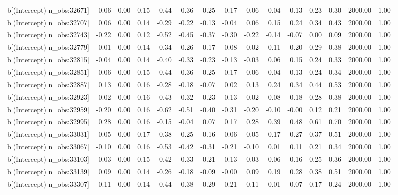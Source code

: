 \begin{table}[ht]
\begin{tabular}{rrrrrrrrrrrrrrr}
  b[(Intercept) n\_obs:32671] & -0.06 & 0.00 & 0.15 & -0.44 & -0.36 & -0.25 & -0.17 & -0.06 & 0.04 & 0.13 & 0.23 & 0.30 & 2000.00 & 1.00 \\ 
  b[(Intercept) n\_obs:32707] & 0.06 & 0.00 & 0.14 & -0.29 & -0.22 & -0.13 & -0.04 & 0.06 & 0.15 & 0.24 & 0.34 & 0.43 & 2000.00 & 1.00 \\ 
  b[(Intercept) n\_obs:32743] & -0.22 & 0.00 & 0.12 & -0.52 & -0.45 & -0.37 & -0.30 & -0.22 & -0.14 & -0.07 & 0.00 & 0.09 & 2000.00 & 1.00 \\ 
  b[(Intercept) n\_obs:32779] & 0.01 & 0.00 & 0.14 & -0.34 & -0.26 & -0.17 & -0.08 & 0.02 & 0.11 & 0.20 & 0.29 & 0.38 & 2000.00 & 1.00 \\ 
  b[(Intercept) n\_obs:32815] & -0.04 & 0.00 & 0.14 & -0.40 & -0.33 & -0.23 & -0.13 & -0.03 & 0.06 & 0.15 & 0.24 & 0.33 & 2000.00 & 1.00 \\ 
  b[(Intercept) n\_obs:32851] & -0.06 & 0.00 & 0.15 & -0.44 & -0.36 & -0.25 & -0.17 & -0.06 & 0.04 & 0.13 & 0.24 & 0.34 & 2000.00 & 1.00 \\ 
  b[(Intercept) n\_obs:32887] & 0.13 & 0.00 & 0.16 & -0.28 & -0.18 & -0.07 & 0.02 & 0.13 & 0.24 & 0.34 & 0.44 & 0.53 & 2000.00 & 1.00 \\ 
  b[(Intercept) n\_obs:32923] & -0.02 & 0.00 & 0.16 & -0.43 & -0.32 & -0.23 & -0.13 & -0.02 & 0.08 & 0.18 & 0.28 & 0.38 & 2000.00 & 1.00 \\ 
  b[(Intercept) n\_obs:32959] & -0.20 & 0.00 & 0.16 & -0.62 & -0.51 & -0.40 & -0.31 & -0.20 & -0.10 & -0.00 & 0.12 & 0.21 & 2000.00 & 1.00 \\ 
  b[(Intercept) n\_obs:32995] & 0.28 & 0.00 & 0.16 & -0.15 & -0.04 & 0.07 & 0.17 & 0.28 & 0.39 & 0.48 & 0.61 & 0.70 & 2000.00 & 1.00 \\ 
  b[(Intercept) n\_obs:33031] & 0.05 & 0.00 & 0.17 & -0.38 & -0.25 & -0.16 & -0.06 & 0.05 & 0.17 & 0.27 & 0.37 & 0.51 & 2000.00 & 1.00 \\ 
  b[(Intercept) n\_obs:33067] & -0.10 & 0.00 & 0.16 & -0.53 & -0.42 & -0.31 & -0.21 & -0.10 & 0.01 & 0.11 & 0.21 & 0.34 & 2000.00 & 1.00 \\ 
  b[(Intercept) n\_obs:33103] & -0.03 & 0.00 & 0.15 & -0.42 & -0.33 & -0.21 & -0.13 & -0.03 & 0.06 & 0.16 & 0.25 & 0.36 & 2000.00 & 1.00 \\ 
  b[(Intercept) n\_obs:33139] & 0.09 & 0.00 & 0.14 & -0.26 & -0.18 & -0.09 & -0.00 & 0.09 & 0.19 & 0.28 & 0.38 & 0.51 & 2000.00 & 1.00 \\ 
  b[(Intercept) n\_obs:33307] & -0.11 & 0.00 & 0.14 & -0.44 & -0.38 & -0.29 & -0.21 & -0.11 & -0.01 & 0.07 & 0.17 & 0.24 & 2000.00 & 1.00 \\ 

\end{tabular}
\end{table}
